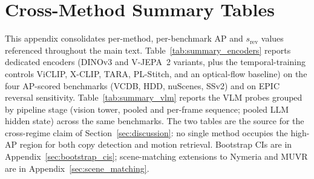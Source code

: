 \documentclass{article}
\theoremstyle{remark}
\begin{document}
\section{Cross-Method Summary Tables}
\label{sec:cross_method_tables}

This appendix consolidates per-method, per-benchmark AP and $s_\text{rev}$ values referenced throughout the main text. Table~\ref{tab:summary_encoders} reports dedicated encoders (DINOv3 and V-JEPA~2 variants, plus the temporal-training controls ViCLIP, X-CLIP, TARA, PL-Stitch, and an optical-flow baseline) on the four AP-scored benchmarks (VCDB, HDD, nuScenes, SSv2) and on EPIC reversal sensitivity. Table~\ref{tab:summary_vlm} reports the VLM probes grouped by pipeline stage (vision tower, pooled and per-frame sequence; pooled LLM hidden state) across the same benchmarks. The two tables are the source for the cross-regime claim of Section~\ref{sec:discussion}: no single method occupies the high-AP region for both copy detection and motion retrieval. Bootstrap CIs are in Appendix~\ref{sec:bootstrap_cis}; scene-matching extensions to Nymeria and MUVR are in Appendix~\ref{sec:scene_matching}.
\end{document}
